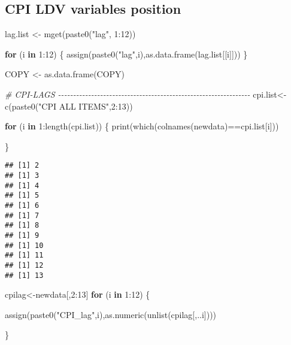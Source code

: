 \documentclass[
]{article}
\newenvironment{Shaded}{\begin{snugshade}}{\end{snugshade}}
\newcommand{\CommentTok}[1]{\textcolor[rgb]{0.56,0.35,0.01}{\textit{#1}}}
\newcommand{\ControlFlowTok}[1]{\textcolor[rgb]{0.13,0.29,0.53}{\textbf{#1}}}
\newcommand{\DecValTok}[1]{\textcolor[rgb]{0.00,0.00,0.81}{#1}}
\newcommand{\FunctionTok}[1]{\textcolor[rgb]{0.00,0.00,0.00}{#1}}
\newcommand{\NormalTok}[1]{#1}
\newcommand{\OtherTok}[1]{\textcolor[rgb]{0.56,0.35,0.01}{#1}}
\newcommand{\SpecialCharTok}[1]{\textcolor[rgb]{0.00,0.00,0.00}{#1}}
\newcommand{\StringTok}[1]{\textcolor[rgb]{0.31,0.60,0.02}{#1}}
\begin{document}
\hypertarget{cpi-ldv-variables-position}{%
\subsection{CPI LDV variables
position}\label{cpi-ldv-variables-position}}

\begin{Shaded}
\begin{Highlighting}[]
\NormalTok{lag.list }\OtherTok{\textless{}{-}} \FunctionTok{mget}\NormalTok{(}\FunctionTok{paste0}\NormalTok{(}\StringTok{"lag"}\NormalTok{, }\DecValTok{1}\SpecialCharTok{:}\DecValTok{12}\NormalTok{))}


\ControlFlowTok{for}\NormalTok{ (i }\ControlFlowTok{in} \DecValTok{1}\SpecialCharTok{:}\DecValTok{12}\NormalTok{) \{}
  \FunctionTok{assign}\NormalTok{(}\FunctionTok{paste0}\NormalTok{(}\StringTok{"lag"}\NormalTok{,i),}\FunctionTok{as.data.frame}\NormalTok{(lag.list[[i]]))}
\NormalTok{\}}

\NormalTok{COPY }\OtherTok{\textless{}{-}} \FunctionTok{as.data.frame}\NormalTok{(COPY)}



\CommentTok{\# CPI{-}LAGS {-}{-}{-}{-}{-}{-}{-}{-}{-}{-}{-}{-}{-}{-}{-}{-}{-}{-}{-}{-}{-}{-}{-}{-}{-}{-}{-}{-}{-}{-}{-}{-}{-}{-}{-}{-}{-}{-}{-}{-}{-}{-}{-}{-}{-}{-}{-}{-}{-}{-}{-}{-}{-}{-}{-}{-}{-}{-}{-}{-}{-}{-}{-}{-}}
\NormalTok{cpi.list}\OtherTok{\textless{}{-}}\FunctionTok{c}\NormalTok{(}\FunctionTok{paste0}\NormalTok{(}\StringTok{"CPI ALL ITEMS"}\NormalTok{,}\DecValTok{2}\SpecialCharTok{:}\DecValTok{13}\NormalTok{))}

\ControlFlowTok{for}\NormalTok{ (i }\ControlFlowTok{in} \DecValTok{1}\SpecialCharTok{:}\FunctionTok{length}\NormalTok{(cpi.list)) \{}
  \FunctionTok{print}\NormalTok{(}\FunctionTok{which}\NormalTok{(}\FunctionTok{colnames}\NormalTok{(newdata)}\SpecialCharTok{==}\NormalTok{cpi.list[i]))}
  
\NormalTok{\}   }
\end{Highlighting}
\end{Shaded}

\begin{verbatim}
## [1] 2
## [1] 3
## [1] 4
## [1] 5
## [1] 6
## [1] 7
## [1] 8
## [1] 9
## [1] 10
## [1] 11
## [1] 12
## [1] 13
\end{verbatim}

\begin{Shaded}
\begin{Highlighting}[]
\NormalTok{cpilag}\OtherTok{\textless{}{-}}\NormalTok{newdata[,}\DecValTok{2}\SpecialCharTok{:}\DecValTok{13}\NormalTok{]}
\ControlFlowTok{for}\NormalTok{ (i }\ControlFlowTok{in} \DecValTok{1}\SpecialCharTok{:}\DecValTok{12}\NormalTok{) \{}

    
 
  \FunctionTok{assign}\NormalTok{(}\FunctionTok{paste0}\NormalTok{(}\StringTok{"CPI\_lag"}\NormalTok{,i),}\FunctionTok{as.numeric}\NormalTok{(}\FunctionTok{unlist}\NormalTok{(cpilag[,..i])))}
  
\NormalTok{\}}
\end{Highlighting}
\end{Shaded}
\end{document}
